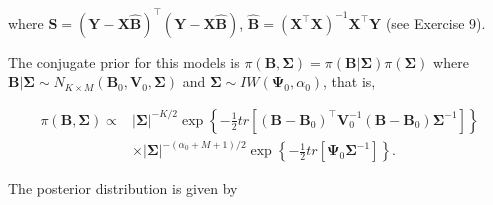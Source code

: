 where ${\bm{S}}= ({\bm{Y}}-{\bm{X}}\widehat{\bm{B}})^{\top}({\bm{Y}}-{\bm{X}}\widehat{\bm{B}})$, $\widehat{\bm{B}}= ({\bm{X}}^{\top}{\bm{X}})^{-1}{\bm{X}}^{\top}{\bm{Y}}$ (see Exercise 9).

The conjugate prior for this models is $\pi({\bm{B}},{\bm{\Sigma}})=\pi({\bm{B}}|{\bm{\Sigma}})\pi({\bm{\Sigma}})$ where ${\bm{B}}|{\bm \Sigma}\sim N_{K\times M}({\bm{B}}_{0},{\bm{V}}_{0},{\bm{\Sigma}})$ and ${\bm{\Sigma}}\sim IW({\bm{\Psi}}_{0},\alpha_{0})$, that is,

\begin{align*}
	\pi ({\bm{B}},{\bm{\Sigma}})\propto &\left|{\bm{\Sigma}} \right|^{-K/2}\exp\left\lbrace -\frac{1}{2}tr\left[({\bm{B}}-{\bm{B}}_{0})^{\top}{\bm{V}}_{0}^{-1}({\bm{B}}-{\bm{B}}_{0}){\bm \Sigma}^{-1}\right]\right\rbrace \\
	& \times \left|{\bm \Sigma} \right|^{-(\alpha_{0}+M+1)/2}\exp\left\lbrace -\frac{1}{2}tr \left[ {\bm{\Psi}}_{0} {\bm \Sigma}^{-1}\right] \right\rbrace.
\end{align*}

The posterior distribution is given by


